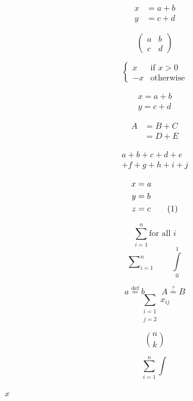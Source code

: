 \documentclass{article}
\begin{document}
$$ \begin{aligned}x &= a + b \\ y &= c + d\end{aligned} $$

$$ \begin{pmatrix}a & b \\ c & d\end{pmatrix} $$

$$ \begin{cases}x & \text{if } x > 0 \\ -x & \text{otherwise}\end{cases} $$

\begin{equation}
\begin{gathered}x = a + b \\ y = c + d\end{gathered}
\end{equation}

\begin{equation}
\begin{split}A &= B + C \\ &= D + E\end{split}
\end{equation}

\begin{multline}
a + b + c + d + e \\
+ f + g + h + i + j
\end{multline}

\begin{align}
x &= a \notag \\
y &= b \nonumber \\
z &= c \tag{1}
\end{align}

$$ \sum_{i=1}^{n} \text{for all } i $$
$$ \sum\nolimits_{i=1}^{n} \qquad \int\limits_{0}^{1} $$

$$ a \stackrel{\text{def}}{=} b \qquad A \overset{?}{=} B $$
$$ \sum_{\substack{i=1 \\ j=2}} x_{ij} $$

$$ \binom{n}{k} $$

$$ \displaystyle \sum_{i=1}^{n} \textstyle \int $$

\DeclareMathOperator{\diag}{diag}

\newcommand{\R}{\mathbb{R}}
\newcommand{\abs}[1]{\left|#1\right|}

\ensuremath{x}
\end{document}
